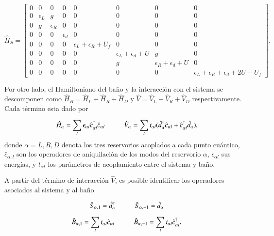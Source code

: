 \begin{equation*}
    \hat{H}_{S} = 
    \begin{bmatrix}
        0 & 0 & 0 & 0 & 0 & 0 & 0 & 0 \\
        0 & \epsilon_{L} & g & 0 & 0 & 0 & 0 & 0 \\
        0 & g & \epsilon_{R} & 0 & 0 & 0 & 0 & 0 \\
        0 & 0 & 0 & \epsilon_{d} & 0 & 0 & 0 & 0 \\
        0 & 0 & 0 & 0 & \epsilon_{L} + \epsilon_{R}  + U_{f} & 0 & 0 & 0 \\
        0 & 0 & 0 & 0 & 0 & \epsilon_{L} + \epsilon_{d} + U & g & 0 \\
        0 & 0 & 0 & 0 & 0 & g & \epsilon_{R} + \epsilon_{d} + U & 0 \\
        0 & 0 & 0 & 0 & 0 & 0 & 0 & \epsilon_{L} + \epsilon_{R}  + \epsilon_{d} + 2U + U_{f} 
        \end{bmatrix}.
\end{equation*}

Por otro lado, el Hamiltoniano del baño y la interacción con el sistema se descomponen como $\hat{H}_{B} = \hat{H}_{L}+\hat{H}_{R}+\hat{H}_{D}$ y $\hat{V} = \hat{V}_{L}+\hat{V}_{R}+\hat{V}_{D}$ respectivamente. Cada término esta dado por 

\begin{equation*}
    \hat{H}_{\alpha} = \sum_{l} \epsilon_{\alpha l} \hat{c}^{\dagger}_{\alpha l}\hat{c}_{\alpha l} \hspace{10mm} \hat{V}_{\alpha} = \sum_{l} t_{\alpha l} ( \hat{d}^{\dagger}_{\alpha} \hat{c}_{\alpha l} + \hat{c}^{\dagger}_{\alpha l} \hat{d}_{\alpha} ),
\end{equation*}
donde $\alpha = L,R,D$ denota los tres reservorios acoplados a cada punto cuántico, $\hat{c}_{\alpha,l}$ son los operadores de aniquilación de los modos del reservorio $\alpha$, $\epsilon_{\alpha l}$ sus energías, y $t_{\alpha l}$ los parámetros de acoplamiento entre el sistema y baño. 

A partir del término de interacción $\hat{V}$, es posible identificar los operadores asociados al sistema y al baño

\begin{equation*}
    \hat{S}_{\alpha,1} = \hat{d}^{\dagger}_{\alpha} \hspace{10mm} \hat{S}_{\alpha,-1} = \hat{d}_{\alpha}
\end{equation*}

\begin{equation*}
    \hat{B}_{\alpha,1} = \sum_{l}t_{\alpha l} \hat{c}_{\alpha l} \hspace{10mm} \hat{B}_{\alpha,-1} = \sum_{l}t_{\alpha l} \hat{c}^{\dagger}_{\alpha l}.
\end{equation*}

